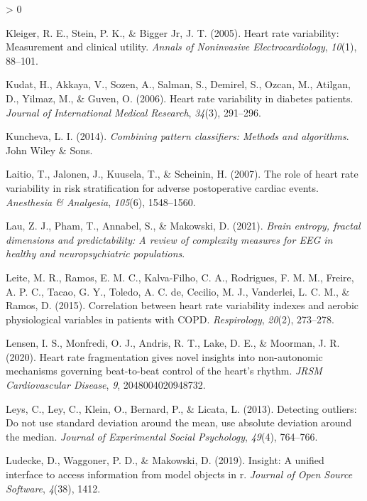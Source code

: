 \documentclass[
  english,
  jou,floatsintext]{apa6}
\newlength{\cslhangindent}
\newenvironment{CSLReferences}[2] %
 {%
  \setlength{\parindent}{0pt}
  \ifodd #1 \everypar{\setlength{\hangindent}{\cslhangindent}}\ignorespaces\fi
  \ifnum #2 > 0
  \setlength{\parskip}{#2\baselineskip}
  \fi
 }%
 {}
\begin{document}
\begin{CSLReferences}{1}{0}
\leavevmode\hypertarget{ref-kleiger2005heart}{}%
Kleiger, R. E., Stein, P. K., \& Bigger Jr, J. T. (2005). Heart rate variability: Measurement and clinical utility. \emph{Annals of Noninvasive Electrocardiology}, \emph{10}(1), 88--101.

\leavevmode\hypertarget{ref-kudat2006heart}{}%
Kudat, H., Akkaya, V., Sozen, A., Salman, S., Demirel, S., Ozcan, M., Atilgan, D., Yilmaz, M., \& Guven, O. (2006). Heart rate variability in diabetes patients. \emph{Journal of International Medical Research}, \emph{34}(3), 291--296.

\leavevmode\hypertarget{ref-kuncheva2014combining}{}%
Kuncheva, L. I. (2014). \emph{Combining pattern classifiers: Methods and algorithms}. John Wiley \& Sons.

\leavevmode\hypertarget{ref-laitio2007role}{}%
Laitio, T., Jalonen, J., Kuusela, T., \& Scheinin, H. (2007). The role of heart rate variability in risk stratification for adverse postoperative cardiac events. \emph{Anesthesia \& Analgesia}, \emph{105}(6), 1548--1560.

\leavevmode\hypertarget{ref-lau2021brain}{}%
Lau, Z. J., Pham, T., Annabel, S., \& Makowski, D. (2021). \emph{Brain entropy, fractal dimensions and predictability: A review of complexity measures for EEG in healthy and neuropsychiatric populations}.

\leavevmode\hypertarget{ref-leite2015correlation}{}%
Leite, M. R., Ramos, E. M. C., Kalva-Filho, C. A., Rodrigues, F. M. M., Freire, A. P. C., Tacao, G. Y., Toledo, A. C. de, Cecilio, M. J., Vanderlei, L. C. M., \& Ramos, D. (2015). Correlation between heart rate variability indexes and aerobic physiological variables in patients with COPD. \emph{Respirology}, \emph{20}(2), 273--278.

\leavevmode\hypertarget{ref-lensen2020heart}{}%
Lensen, I. S., Monfredi, O. J., Andris, R. T., Lake, D. E., \& Moorman, J. R. (2020). Heart rate fragmentation gives novel insights into non-autonomic mechanisms governing beat-to-beat control of the heart's rhythm. \emph{JRSM Cardiovascular Disease}, \emph{9}, 2048004020948732.

\leavevmode\hypertarget{ref-leys2013detecting}{}%
Leys, C., Ley, C., Klein, O., Bernard, P., \& Licata, L. (2013). Detecting outliers: Do not use standard deviation around the mean, use absolute deviation around the median. \emph{Journal of Experimental Social Psychology}, \emph{49}(4), 764--766.

\leavevmode\hypertarget{ref-ludecke2019insight}{}%
Ludecke, D., Waggoner, P. D., \& Makowski, D. (2019). Insight: A unified interface to access information from model objects in r. \emph{Journal of Open Source Software}, \emph{4}(38), 1412.


\end{CSLReferences}
\end{document}

